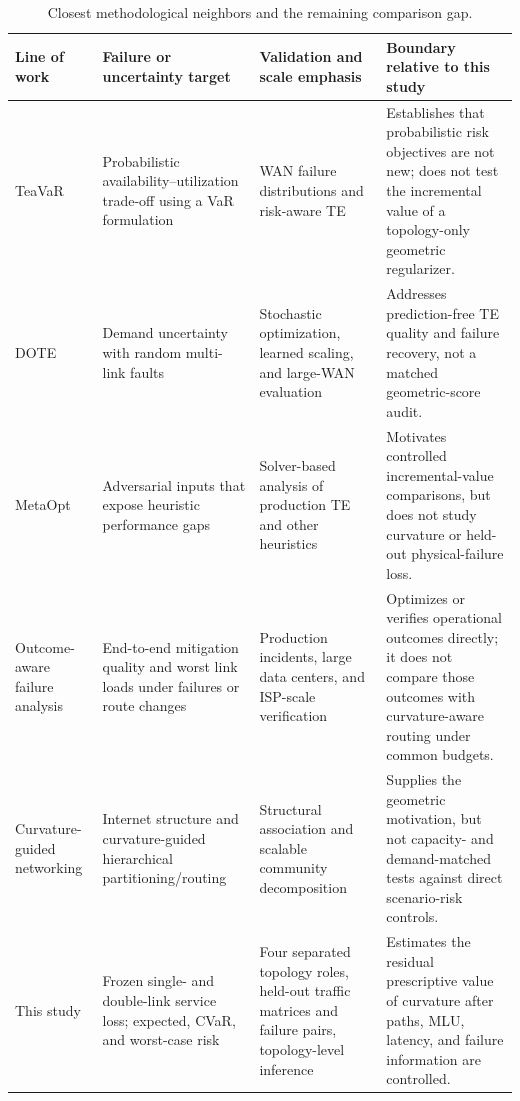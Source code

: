 \begin{table}[t]
\centering
\caption{Closest methodological neighbors and the remaining comparison gap.}
\label{tab:closest-work}
\scriptsize
\setlength{\tabcolsep}{3pt}
\renewcommand{\arraystretch}{1.08}
\begin{tabular}{p{}p{}p{}p{}}
\toprule
Line of work & Failure or uncertainty target & Validation and scale emphasis & Boundary relative to this study \\
\midrule
TeaVaR \cite{bogle2019teavar} & Probabilistic availability--utilization trade-off using a VaR formulation & WAN failure distributions and risk-aware TE & Establishes that probabilistic risk objectives are not new; does not test the incremental value of a topology-only geometric regularizer. \\
DOTE \cite{perry2023dote} & Demand uncertainty with random multi-link faults & Stochastic optimization, learned scaling, and large-WAN evaluation & Addresses prediction-free TE quality and failure recovery, not a matched geometric-score audit. \\
MetaOpt \cite{namyar2024metaopt} & Adversarial inputs that expose heuristic performance gaps & Solver-based analysis of production TE and other heuristics & Motivates controlled incremental-value comparisons, but does not study curvature or held-out physical-failure loss. \\
Outcome-aware failure analysis \cite{namyar2025mitigation,schneider2025loads} & End-to-end mitigation quality and worst link loads under failures or route changes & Production incidents, large data centers, and ISP-scale verification & Optimizes or verifies operational outcomes directly; it does not compare those outcomes with curvature-aware routing under common budgets. \\
Curvature-guided networking \cite{ni2015,chiriac2026hierarchical} & Internet structure and curvature-guided hierarchical partitioning/routing & Structural association and scalable community decomposition & Supplies the geometric motivation, but not capacity- and demand-matched tests against direct scenario-risk controls. \\
This study & Frozen single- and double-link service loss; expected, CVaR, and worst-case risk & Four separated topology roles, held-out traffic matrices and failure pairs, topology-level inference & Estimates the residual prescriptive value of curvature after paths, MLU, latency, and failure information are controlled. \\
\bottomrule
\end{tabular}
\end{table}
